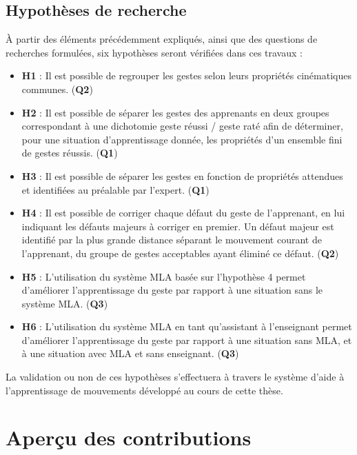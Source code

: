 \subsection{Hypothèses de recherche}
À partir des éléments précédemment expliqués, ainsi que des questions de recherches formulées, six hypothèses seront vérifiées dans ces travaux :
\begin{itemize}
	\item \textbf{H1} : Il est possible de regrouper les gestes selon leurs propriétés cinématiques communes. (\textbf{Q2})
	\item \textbf{H2} : Il est possible de séparer les gestes des apprenants en deux groupes correspondant à une dichotomie geste réussi / geste raté afin de déterminer, pour une situation d'apprentissage donnée, les propriétés d'un ensemble fini de gestes réussis. (\textbf{Q1})
	\item \textbf{H3} : Il est possible de séparer les gestes en fonction de propriétés attendues et identifiées au préalable par l'expert. (\textbf{Q1})
	\item \textbf{H4} : Il est possible de corriger chaque défaut du geste de l'apprenant, en lui indiquant les défauts majeurs à corriger en premier. Un défaut majeur est identifié par la plus grande distance séparant le mouvement courant de l'apprenant, du groupe de gestes acceptables ayant éliminé ce défaut. (\textbf{Q2})
	\item \textbf{H5} : L'utilisation du système MLA basée sur l'hypothèse 4 permet d'améliorer l'apprentissage du geste par rapport à une situation sans le système MLA. (\textbf{Q3})
	\item \textbf{H6} : L'utilisation du système MLA en tant qu'assistant à l'enseignant permet d'améliorer l'apprentissage du geste par rapport à une situation sans MLA, et à une situation avec MLA et sans enseignant. (\textbf{Q3})
\end{itemize}

La validation ou non de ces hypothèses s'effectuera à travers le système d'aide à l'apprentissage de mouvements développé au cours de cette thèse.

\section{Aperçu des contributions}
